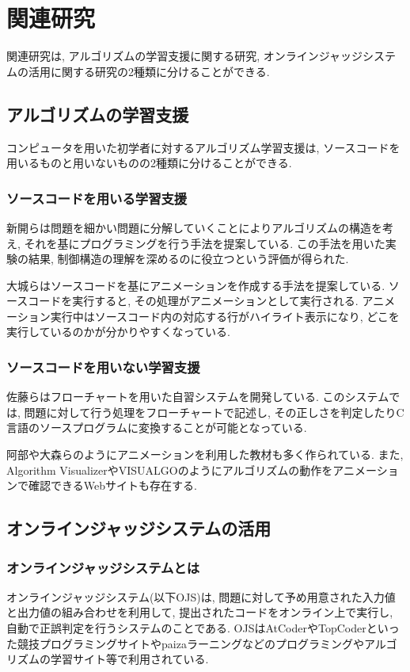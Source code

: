 \section{関連研究}

関連研究は, アルゴリズムの学習支援に関する研究, オンラインジャッジシステムの活用に関する研究の2種類に分けることができる. 

\subsection{アルゴリズムの学習支援}
コンピュータを用いた初学者に対するアルゴリズム学習支援は, ソースコードを用いるものと用いないものの2種類に分けることができる. 

\subsubsection{ソースコードを用いる学習支援}
新開ら\cite{shinkai2007}は問題を細かい問題に分解していくことによりアルゴリズムの構造を考え, それを基にプログラミングを行う手法を提案している. 
この手法を用いた実験の結果, 制御構造の理解を深めるのに役立つという評価が得られた. 

大城ら\cite{ooshiro2018}はソースコードを基にアニメーションを作成する手法を提案している. 
ソースコードを実行すると, その処理がアニメーションとして実行される. 
アニメーション実行中はソースコード内の対応する行がハイライト表示になり, どこを実行しているのかが分かりやすくなっている. 

\subsubsection{ソースコードを用いない学習支援}
佐藤ら\cite{sato2012}はフローチャートを用いた自習システムを開発している. 
このシステムでは, 問題に対して行う処理をフローチャートで記述し, その正しさを判定したりC言語のソースプログラムに変換することが可能となっている. 

阿部\cite{abe2003}や大森ら\cite{oomori1996}のようにアニメーションを利用した教材も多く作られている. 
また, Algorithm Visualizer\cite{Algorithm Visualizer}やVISUALGO\cite{VISUALGO}のようにアルゴリズムの動作をアニメーションで確認できるWebサイトも存在する. 

\clearpage

\subsection{オンラインジャッジシステムの活用}

\subsubsection{オンラインジャッジシステムとは}
\label{subsec:ojs}
オンラインジャッジシステム(以下OJS)は, 問題に対して予め用意された入力値と出力値の組み合わせを利用して, 提出されたコードをオンライン上で実行し, 自動で正誤判定を行うシステムのことである. 
OJSはAtCoder\cite{AtCoder}やTopCoder\cite{TopCoder}といった競技プログラミングサイトやpaizaラーニング\cite{paiza}などのプログラミングやアルゴリズムの学習サイト等で利用されている. 


